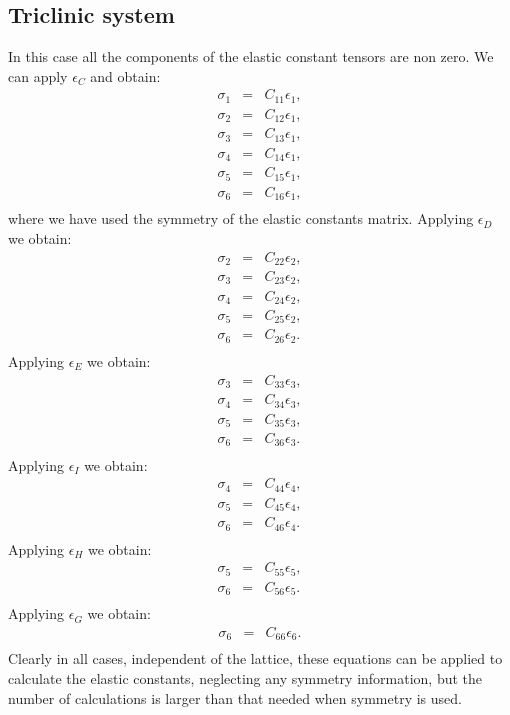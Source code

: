 \documentclass[12pt,a4paper]{article}
\begin{document}
\subsection{\color{web-blue}Triclinic system}
In this case all the components of the elastic constant tensors are non zero.
We can apply $\epsilon_C$ and obtain:
\begin{eqnarray}
\sigma_1&=&C_{11} \epsilon_1,  \\
\sigma_2&=&C_{12} \epsilon_1,  \\
\sigma_3&=&C_{13} \epsilon_1,  \\
\sigma_4&=&C_{14} \epsilon_1,  \\
\sigma_5&=&C_{15} \epsilon_1,  \\
\sigma_6&=&C_{16} \epsilon_1,  \\
\end{eqnarray}
where we have used the symmetry of the elastic constants matrix.
Applying $\epsilon_D$ we obtain:
\begin{eqnarray}
\sigma_2&=&C_{22} \epsilon_2,  \\
\sigma_3&=&C_{23} \epsilon_2,  \\
\sigma_4&=&C_{24} \epsilon_2,  \\
\sigma_5&=&C_{25} \epsilon_2,  \\
\sigma_6&=&C_{26} \epsilon_2.  \\
\end{eqnarray}
Applying $\epsilon_E$ we obtain:
\begin{eqnarray}
\sigma_3&=&C_{33} \epsilon_3,  \\
\sigma_4&=&C_{34} \epsilon_3,  \\
\sigma_5&=&C_{35} \epsilon_3,  \\
\sigma_6&=&C_{36} \epsilon_3.  \\
\end{eqnarray}
Applying $\epsilon_I$ we obtain:
\begin{eqnarray}
\sigma_4&=&C_{44} \epsilon_4,  \\
\sigma_5&=&C_{45} \epsilon_4,  \\
\sigma_6&=&C_{46} \epsilon_4.  \\
\end{eqnarray}
Applying $\epsilon_H$ we obtain:
\begin{eqnarray}
\sigma_5&=&C_{55} \epsilon_5,  \\
\sigma_6&=&C_{56} \epsilon_5.  \\
\end{eqnarray}
Applying $\epsilon_G$ we obtain:
\begin{eqnarray}
\sigma_6&=&C_{66} \epsilon_6.  \\
\end{eqnarray}
Clearly in all cases, independent of the lattice, these equations can be
applied to calculate the elastic constants, neglecting any symmetry
information, but the number of calculations is larger than that needed
when symmetry is used.
\end{document}

